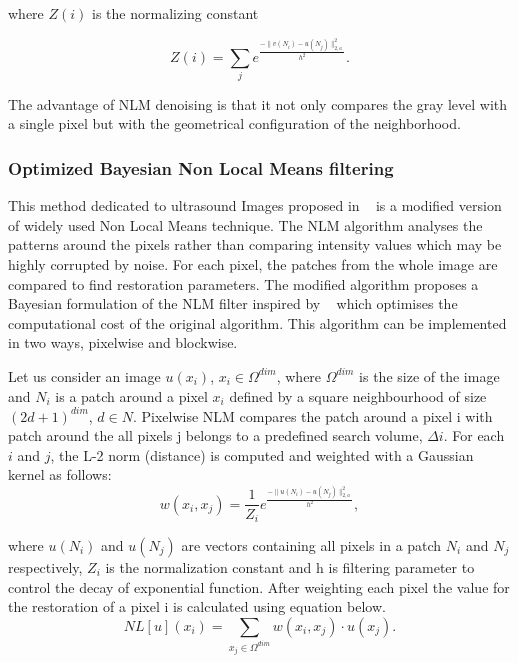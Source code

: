 where $Z(i)$ is the normalizing constant 

\begin{equation}
Z(i)=\sum_{j}{e^{\frac{-\parallel v(N_i)-u(N_j) \parallel _{2,a}^2 }{h^2}}}.
\end{equation}

The advantage of NLM denoising is that it not only compares the gray level with a single pixel but with the geometrical configuration of the neighborhood. 

\subsubsection{Optimized Bayesian Non Local Means filtering}

This method dedicated to ultrasound Images proposed in ~\cite{obnlm} is a modified version of widely used Non Local Means technique. The NLM algorithm analyses the patterns around the pixels rather than comparing intensity values which may be highly corrupted by noise. For each pixel, the patches from the whole image are compared to find restoration parameters. The modified algorithm proposes a Bayesian formulation of the NLM filter inspired by ~\cite{bayesian} which optimises the computational cost of the original algorithm. This algorithm can be implemented in two ways, pixelwise and blockwise. 

Let us consider an image $u(x_i)$, $x_i  \in \Omega^{dim}$, where $\Omega^{dim}$ is the size of the image and $N_i$ is a patch around a pixel $x_i$ defined by a square neighbourhood of size $(2d +1)^{dim}$, $d \in N$. Pixelwise NLM compares the patch around a pixel i with patch around the all pixels j belongs to a predefined search volume, $\Delta i$. For each $i$ and $j$, the L-2 norm (distance) is computed and weighted with a Gaussian kernel as follows: 
\begin{equation}
	w(x_i,x_j)=\frac{1}{Z_i} e^{\frac{-\parallel u(N_i)-u(N_j) \parallel _{2,a}^2 }{h^2}},
\end{equation}

where $u(N_i)$ and $u(N_j )$ are vectors containing all pixels in a patch $N_i$ and $N_j$ respectively, $Z_i$  is the normalization constant and h is filtering parameter to control the decay of exponential function. 
After weighting each pixel the value for the restoration of a pixel i is calculated using equation below.
\begin{equation}
NL[u](x_{i})=\sum_{x_j \in \Omega^{dim}}{w(x_{i}, x_{j})\cdot u(x_j)}.
\end{equation}

